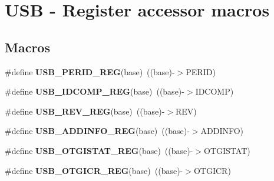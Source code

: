 \hypertarget{group__USB__Register__Accessor__Macros}{}\section{U\+SB -\/ Register accessor macros}
\label{group__USB__Register__Accessor__Macros}
\subsection*{Macros}
\begin{DoxyCompactItemize}
\item 
\#define {\bfseries U\+S\+B\+\_\+\+P\+E\+R\+I\+D\+\_\+\+R\+EG}(base)~((base)-\/$>$P\+E\+R\+ID)\hypertarget{group__USB__Register__Accessor__Macros_ga61c99097ee83a271dafdfb6b04980cc8}{}\label{group__USB__Register__Accessor__Macros_ga61c99097ee83a271dafdfb6b04980cc8}

\item 
\#define {\bfseries U\+S\+B\+\_\+\+I\+D\+C\+O\+M\+P\+\_\+\+R\+EG}(base)~((base)-\/$>$I\+D\+C\+O\+MP)\hypertarget{group__USB__Register__Accessor__Macros_ga74152969f2622631ccd8ceccf72c4e7e}{}\label{group__USB__Register__Accessor__Macros_ga74152969f2622631ccd8ceccf72c4e7e}

\item 
\#define {\bfseries U\+S\+B\+\_\+\+R\+E\+V\+\_\+\+R\+EG}(base)~((base)-\/$>$R\+EV)\hypertarget{group__USB__Register__Accessor__Macros_gafdbb3ea723c0bb8a1f5bb42e84fbdfe5}{}\label{group__USB__Register__Accessor__Macros_gafdbb3ea723c0bb8a1f5bb42e84fbdfe5}

\item 
\#define {\bfseries U\+S\+B\+\_\+\+A\+D\+D\+I\+N\+F\+O\+\_\+\+R\+EG}(base)~((base)-\/$>$A\+D\+D\+I\+N\+FO)\hypertarget{group__USB__Register__Accessor__Macros_ga618d42fa57e39a224a30a72f347573fb}{}\label{group__USB__Register__Accessor__Macros_ga618d42fa57e39a224a30a72f347573fb}

\item 
\#define {\bfseries U\+S\+B\+\_\+\+O\+T\+G\+I\+S\+T\+A\+T\+\_\+\+R\+EG}(base)~((base)-\/$>$O\+T\+G\+I\+S\+T\+AT)\hypertarget{group__USB__Register__Accessor__Macros_ga1b290906273a7a293d262a00c3425319}{}\label{group__USB__Register__Accessor__Macros_ga1b290906273a7a293d262a00c3425319}

\item 
\#define {\bfseries U\+S\+B\+\_\+\+O\+T\+G\+I\+C\+R\+\_\+\+R\+EG}(base)~((base)-\/$>$O\+T\+G\+I\+CR)\hypertarget{group__USB__Register__Accessor__Macros_ga96be0cb820aa0542e4c046f814b61636}{}\label{group__USB__Register__Accessor__Macros_ga96be0cb820aa0542e4c046f814b61636}


\end{DoxyCompactItemize}
